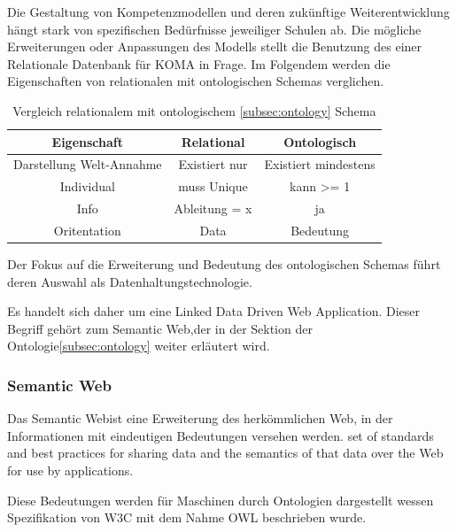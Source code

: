 \documentclass[
12pt,
english,
ngerman,
headsepline,
twoside,
openright,
numbers=noenddot,version=first
]{scrreprt}
\providecommand{\tabularnewline}{\\}
\begin{document}
Die Gestaltung von Kompetenzmodellen und deren zukünftige Weiterentwicklung hängt stark von spezifischen Bedürfnisse jeweiliger Schulen ab. Die mögliche Erweiterungen oder Anpassungen des Modells stellt die Benutzung des einer Relationale Datenbank für \acrshort{KOMA} in Frage. Im Folgendem werden die Eigenschaften von relationalen mit ontologischen Schemas verglichen.


\begin{table}[h]
	\caption{Vergleich relationalem mit ontologischem \ref{subsec:ontology} Schema}
	
	\centering{}
	\begin{tabular}{ccc}
		\noalign{\vskip\doublerulesep}
		Eigenschaft & Relational & Ontologisch \tabularnewline[\doublerulesep]
		\hline\noalign{\vskip\doublerulesep}
		Darstellung Welt-Annahme & Existiert nur & Existiert mindestens \tabularnewline[\doublerulesep]
		\noalign{\vskip\doublerulesep}
		Individual & muss Unique & kann >= 1 \tabularnewline[\doublerulesep]
		\noalign{\vskip\doublerulesep}
		Info & Ableitung = x & ja \tabularnewline[\doublerulesep]
		\noalign{\vskip\doublerulesep}
		Oritentation & Data & Bedeutung \tabularnewline[\doublerulesep]
		
	\end{tabular}
\end{table}

Der Fokus auf die Erweiterung und Bedeutung des ontologischen Schemas führt deren Auswahl als Datenhaltungstechnologie. 

Es handelt sich daher um eine \glqq Linked Data Driven Web Application\grqq.%
Dieser Begriff gehört zum \glqq Semantic Web\grqq,der in der Sektion der Ontologie\ref{subsec:ontology} weiter erläutert wird.

\subsubsection{Semantic Web}

Das \glqq Semantic Web\grqq ist eine Erweiterung des herkömmlichen Web, in der Informationen mit eindeutigen Bedeutungen versehen werden\cite{ontoWhat2}.
set of standards and best practices for sharing data and the semantics of that data over the Web for use by applications\cite{sparqlLearn}.

Diese Bedeutungen werden für Maschinen durch Ontologien dargestellt wessen Spezifikation von W3C\cite{W3C} mit dem Nahme \acrfull{OWL} beschrieben wurde.
\end{document}
